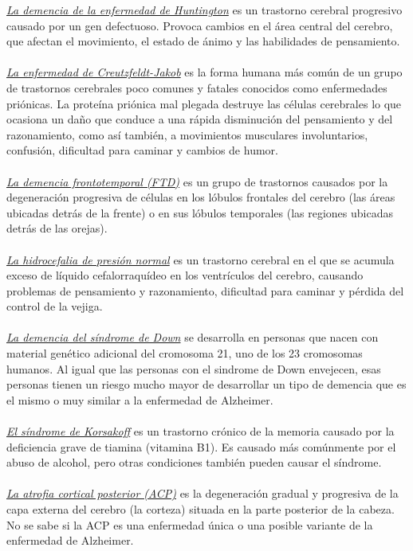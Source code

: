 \documentclass[smallextended, 12pt]{article}
\begin{document}
	\underline{\textit{La demencia de la enfermedad de Huntington}} es un trastorno cerebral progresivo causado por un gen defectuoso. Provoca cambios en el \'area central del cerebro, que afectan el movimiento, el estado de \'animo y las habilidades de pensamiento. \cite{ref9} \\
	\\
	\underline{\textit{La enfermedad de Creutzfeldt-Jakob}} es la forma humana m\'as com\'un de un grupo de trastornos cerebrales poco comunes y fatales conocidos como enfermedades pri\'onicas. La prote\'ina pri\'onica mal plegada destruye las c\'elulas cerebrales lo que ocasiona un da\~no que conduce a una r\'apida disminuci\'on del pensamiento y del razonamiento, como as\'i tambi\'en, a movimientos musculares involuntarios, confusi\'on, dificultad para caminar y cambios de humor. \cite{ref9} \\
	\\
	\underline{\textit{La demencia frontotemporal (FTD)}} es un grupo de trastornos causados por la degeneraci\'on progresiva de c\'elulas en los l\'obulos frontales del cerebro (las \'areas ubicadas detr\'as de la frente) o en sus l\'obulos temporales (las regiones ubicadas detr\'as de las orejas). \cite{ref9} \\
	\\
	\underline{\textit{La hidrocefalia de presi\'on normal}} es un trastorno cerebral en el que se acumula exceso de l\'iquido cefalorraqu\'ideo en los ventr\'iculos del cerebro, causando problemas de pensamiento y razonamiento, dificultad para caminar y p\'erdida del control de la vejiga. \cite{ref9} \\
	\\
	\underline{\textit{La demencia del s\'indrome de Down}} se desarrolla en personas que nacen con material gen\'etico adicional del cromosoma 21, uno de los 23 cromosomas humanos. Al igual que las personas con el sindrome de Down envejecen, esas personas tienen un riesgo mucho mayor de desarrollar un tipo de demencia que es el mismo o muy similar a la enfermedad de Alzheimer. \cite{ref9} \\
	\\
	\underline{\textit{El s\'indrome de Korsakoff}} es un trastorno cr\'onico de la memoria causado por la deficiencia grave de tiamina (vitamina B1). Es causado m\'as com\'unmente por el abuso de alcohol, pero otras condiciones tambi\'en pueden causar el s\'indrome. \cite{ref9} \\
	\\
	\underline{\textit{La atrofia cortical posterior (ACP)}} es la degeneraci\'on gradual y progresiva de la capa externa del cerebro (la corteza) situada en la parte posterior de la cabeza. No se sabe si la ACP es una enfermedad \'unica o una posible variante de la enfermedad de Alzheimer. \cite{ref9}
	
	
	
	
	
\end{document}
